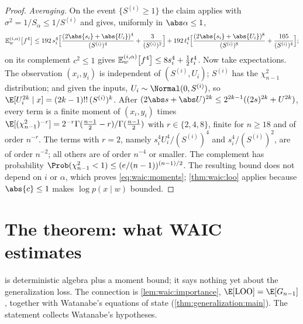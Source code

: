 \begin{refsection}
\begin{proof}
\emph{Averaging.} On the event $\{S^{(i)}\ge1\}$ the claim applies with $\sigma^2=1/S_\alpha\le1/S^{(i)}$ and gives, uniformly in $\abs\alpha\le1$,
\[
\waicEt{\alpha}{f^4}\le192\,s_i^4\Bigl[\frac{(2\abs{s_i}+\abs{U_i})^4}{(S^{(i)})^4}+\frac3{(S^{(i)})^2}\Bigr]+192\,t_i^4\Bigl[\frac{(2\abs{s_i}+\abs{U_i})^8}{(S^{(i)})^8}+\frac{105}{(S^{(i)})^4}\Bigr];
\]
on its complement $c^2\le1$ gives $\mathbb{E}^{(i,\alpha)}_{w}\!\left[f^4\right]\le8s_i^4+\tfrac12t_i^4$. Now take expectations. The observation $(x_i,y_i)$ is independent of $(S^{(i)},U_i)$; $S^{(i)}$ has the $\chi^2_{n-1}$ distribution; and given the inputs, $U_i\sim\Normal(0,S^{(i)})$, so $\E[U_i^{2k}\mid x]=(2k-1)!!\,(S^{(i)})^k$. After $(2\abs s+\abs U)^{2k}\le2^{2k-1}((2s)^{2k}+U^{2k})$, every term is a finite moment of $(x_i,y_i)$ times $\E[(\chi^2_{n-1})^{-r}]=2^{-r}\Gamma(\tfrac{n-1}2-r)/\Gamma(\tfrac{n-1}2)$ with $r\in\{2,4,8\}$, finite for $n\ge18$ and of order $n^{-r}$. The terms with $r=2$, namely $s_i^4U_i^4/(S^{(i)})^4$ and $s_i^4/(S^{(i)})^2$, are of order $n^{-2}$; all others are of order $n^{-4}$ or smaller. The complement has probability $\Prob(\chi^2_{n-1}<1)\le(e/(n-1))^{(n-1)/2}$. The resulting bound does not depend on $i$ or $\alpha$, which proves \eqref{eq:waic:moments}; \cref{thm:waic:loo} applies because $\abs{c}\le1$ makes $\log p(x\mid w)$ bounded.
\end{proof}

\section{The theorem: what WAIC estimates}\label{sec:waic:main}

 is deterministic algebra plus a moment bound; it says nothing yet about the generalization loss. The connection is \cref{lem:waic:importance}, $\E[\waicLOO]=\E[G_{n-1}]$, together with Watanabe's equations of state (\cref{thm:generalization:main}). The statement collects Watanabe's hypotheses.


\end{refsection}
